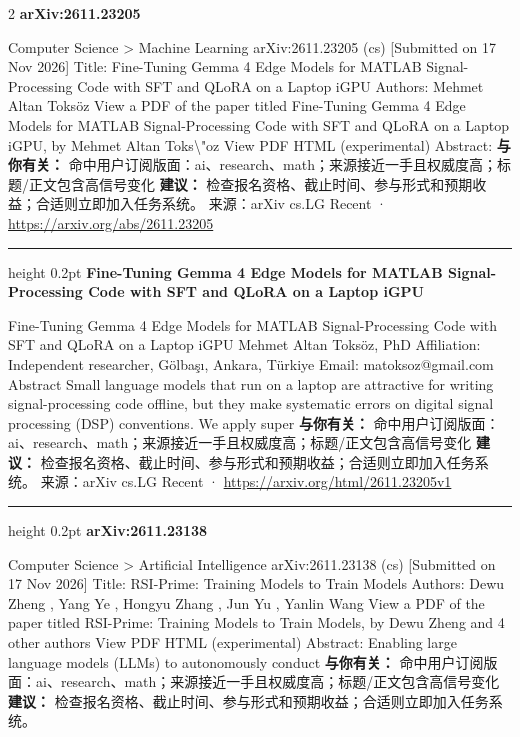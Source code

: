 \documentclass[10.5pt]{ctexart}
\begin{document}
\begin{multicols}{2}
{\large\bfseries arXiv:2611.23205}\par
Computer Science > Machine Learning arXiv:2611.23205 (cs) [Submitted on 17 Nov 2026] Title: Fine-Tuning Gemma 4 Edge Models for MATLAB Signal-Processing Code with SFT and QLoRA on a Laptop iGPU Authors: Mehmet Altan Toksöz View a PDF of the paper titled Fine-Tuning Gemma 4 Edge Models for MATLAB Signal-Processing Code with SFT and QLoRA on a Laptop iGPU, by Mehmet Altan Toks\textbackslash{}"oz View PDF HTML (experimental) Abstract:
\textbf{与你有关：} 命中用户订阅版面：ai、research、math；来源接近一手且权威度高；标题/正文包含高信号变化
\textbf{建议：} 检查报名资格、截止时间、参与形式和预期收益；合适则立即加入任务系统。
{\footnotesize\color{ormuted} 来源：arXiv cs.LG Recent · \url{https://arxiv.org/abs/2611.23205}}
\vspace{2mm}
\hrule height 0.2pt
\vspace{2mm}
{\large\bfseries Fine-Tuning Gemma 4 Edge Models for MATLAB Signal-Processing Code with SFT and QLoRA on a Laptop iGPU}\par
Fine-Tuning Gemma 4 Edge Models for MATLAB Signal-Processing Code with SFT and QLoRA on a Laptop iGPU Mehmet Altan Toksöz, PhD Affiliation: Independent researcher, Gölbaşı, Ankara, Türkiye Email: matoksoz@gmail.com Abstract Small language models that run on a laptop are attractive for writing signal-processing code offline, but they make systematic errors on digital signal processing (DSP) conventions. We apply super
\textbf{与你有关：} 命中用户订阅版面：ai、research、math；来源接近一手且权威度高；标题/正文包含高信号变化
\textbf{建议：} 检查报名资格、截止时间、参与形式和预期收益；合适则立即加入任务系统。
{\footnotesize\color{ormuted} 来源：arXiv cs.LG Recent · \url{https://arxiv.org/html/2611.23205v1}}
\vspace{2mm}
\hrule height 0.2pt
\vspace{2mm}
{\large\bfseries arXiv:2611.23138}\par
Computer Science > Artificial Intelligence arXiv:2611.23138 (cs) [Submitted on 17 Nov 2026] Title: RSI-Prime: Training Models to Train Models Authors: Dewu Zheng , Yang Ye , Hongyu Zhang , Jun Yu , Yanlin Wang View a PDF of the paper titled RSI-Prime: Training Models to Train Models, by Dewu Zheng and 4 other authors View PDF HTML (experimental) Abstract: Enabling large language models (LLMs) to autonomously conduct 
\textbf{与你有关：} 命中用户订阅版面：ai、research、math；来源接近一手且权威度高；标题/正文包含高信号变化
\textbf{建议：} 检查报名资格、截止时间、参与形式和预期收益；合适则立即加入任务系统。

\end{multicols}
\end{document}
